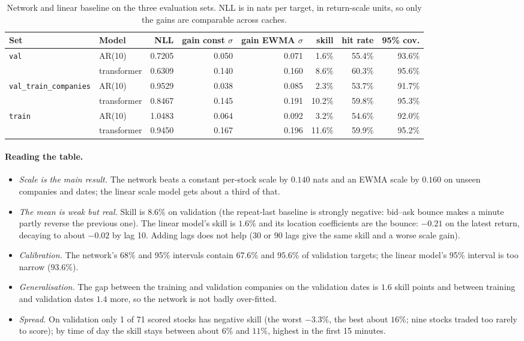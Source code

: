 \documentclass[11pt]{article}
\newcommand{\code}[1]{\texttt{#1}}
\begin{document}
\begin{table}[h]
\centering\footnotesize\setlength{\tabcolsep}{4pt}
\caption{Network and linear baseline on the three evaluation sets. NLL is in nats per target, in return-scale units, so only the gains are comparable across caches.}
\begin{tabular}{@{}llrrrrrr@{}}
\toprule
Set & Model & NLL & gain const $\sigma$ & gain EWMA $\sigma$ & skill & hit rate & 95\% cov. \\
\midrule
\code{val}                 & AR(10)      & 0.7205 & 0.050 & 0.071 & 1.6\%  & 55.4\% & 93.6\% \\
                           & transformer & 0.6309 & 0.140 & 0.160 & 8.6\%  & 60.3\% & 95.6\% \\
\addlinespace
\code{val\_train\_companies} & AR(10)    & 0.9529 & 0.038 & 0.085 & 2.3\%  & 53.7\% & 91.7\% \\
                           & transformer & 0.8467 & 0.145 & 0.191 & 10.2\% & 59.8\% & 95.3\% \\
\addlinespace
\code{train}               & AR(10)      & 1.0483 & 0.064 & 0.092 & 3.2\%  & 54.6\% & 92.0\% \\
                           & transformer & 0.9450 & 0.167 & 0.196 & 11.6\% & 59.9\% & 95.2\% \\
\bottomrule
\end{tabular}
\end{table}

\paragraph{Reading the table.}
\begin{itemize}
  \item \emph{Scale is the main result.} The network beats a constant per-stock scale by $0.140$ nats and an EWMA scale by $0.160$ on unseen companies and dates; the linear scale model gets about a third of that.
  \item \emph{The mean is weak but real.} Skill is $8.6\%$ on validation (the repeat-last baseline is strongly negative: bid--ask bounce makes a minute partly reverse the previous one). The linear model's skill is $1.6\%$ and its location coefficients are the bounce: $-0.21$ on the latest return, decaying to about $-0.02$ by lag 10.
        Adding lags does not help (30 or 90 lags give the same skill and a worse scale gain).
  \item \emph{Calibration.} The network's 68\% and 95\% intervals contain $67.6\%$ and $95.6\%$ of validation targets; the linear model's 95\% interval is too narrow ($93.6\%$).
  \item \emph{Generalisation.} The gap between the training and validation companies on the validation dates is $1.6$ skill points and between training and validation dates $1.4$ more, so the network is not badly over-fitted.
  \item \emph{Spread.} On validation only 1 of 71 scored stocks has negative skill (the worst $-3.3\%$, the best about $16\%$; nine stocks traded too rarely to score); by time of day the skill stays between about $6\%$ and $11\%$, highest in the first 15 minutes.
\end{itemize}
\end{document}
